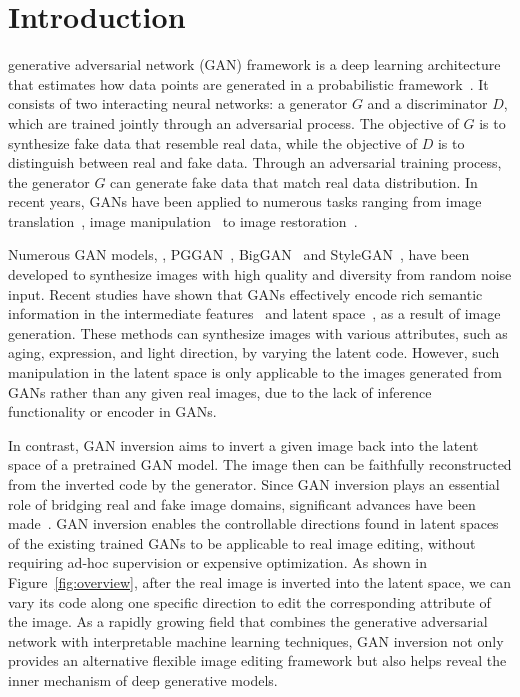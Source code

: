 \section{Introduction}
\label{sec:introduction}
 generative adversarial network (GAN) framework is a deep learning architecture that estimates how data points are generated in a probabilistic framework~\cite{goodfellow2014generative,goodfellow2016deep}.
It consists of two interacting neural networks: a generator $G$ and a discriminator $D$, which are trained jointly through an adversarial process.
The objective of $G$ is to synthesize fake data that resemble real data, while the objective of $D$ is to distinguish between real and fake data. 
Through an adversarial training process, the generator $G$ can generate fake data that match real data distribution. 
In recent years, GANs have been applied to numerous tasks
ranging from image translation~\cite{mao2019mode,lee2018drit,huang2018munit}, image manipulation~\cite{wang2018high,xia2020gaze,li2020manigan} to image restoration~\cite{zhang2017beyond,tsai2017deep,xu2017text,ma2017learning,li2018flow}.

Numerous GAN models, \eg, PGGAN~\cite{karras2017progressive}, BigGAN~\cite{brock2018large} and StyleGAN~\cite{karras2019style,karras2020analyzing}, have been developed to synthesize images with high quality and diversity from random noise input. 
Recent studies have shown that GANs effectively encode rich semantic information in the intermediate features~\cite{bau2019semantic} and latent space~\cite{goetschalckx2019ganalyze,jahanian2020steerability, shen2020interpreting}, as a result of image generation.
These methods can synthesize images with various attributes, such as aging, expression, and light direction, by varying the latent code. 
However, such manipulation in the latent space is only applicable to the images generated from GANs rather than any given real images, due to the lack of inference functionality or encoder in GANs. 

\figoverview

In contrast, GAN inversion aims to invert a given image back into the latent space of a pretrained GAN model. The image then can be faithfully reconstructed from the inverted code by the generator. 
Since GAN inversion plays an essential role of bridging real and fake image domains, significant advances have been made~\cite{zhu2016generative,abdal2019image2stylegan,abdal2020image2stylegan2,bau2019seeing,karras2020analyzing,huh2020transforming,pan2020exploiting,jahanian2020steerability,shen2020interpreting}. 
GAN inversion enables the controllable directions found in latent spaces of the existing trained GANs to be applicable to real image editing, without requiring ad-hoc supervision or expensive optimization. 
As shown in Figure~\ref{fig:overview}, after the real image is inverted into the latent space, we can vary its code along one specific direction to edit the corresponding attribute of the image. 
As a rapidly growing field that combines the generative adversarial network with interpretable machine learning techniques, GAN inversion not only provides an alternative flexible image editing framework but also helps reveal the inner mechanism of deep generative models. 

